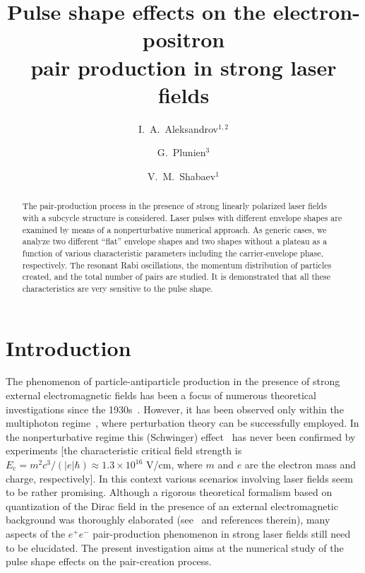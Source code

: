 \documentclass[preprint,aps,prd,showpacs,floatfix]{revtex4-1}
\begin{document}
%
\thispagestyle{empty}

    \title{Pulse shape effects on the electron-positron\\pair production in strong laser fields}

\author{I.~A.~Aleksandrov$^{1, 2}$}\author{G.~Plunien$^{3}$} \author{V.~M.~Shabaev$^{1}$}

\begin{abstract}
The pair-production process in the presence of strong linearly polarized laser fields with a subcycle structure is considered. Laser pulses with different envelope shapes are examined by means of a nonperturbative numerical approach. As generic cases, we analyze two different ``flat'' envelope shapes and two shapes without a plateau as a function of various characteristic parameters including the carrier-envelope phase, respectively. The resonant Rabi oscillations, the momentum distribution of particles created, and the total number of pairs are studied. It is demonstrated that all these characteristics are very sensitive to the pulse shape.
\end{abstract}


\maketitle
%
\section{Introduction}\label{sec:intro}
%
\indent The phenomenon of particle-antiparticle production in the presence of strong external electromagnetic fields has been a focus of numerous theoretical investigations since the 1930s~\cite{sauter_1931, euler_heisenberg}. However, it has been observed only within the multiphoton regime~\cite{burke_prl_1997}, where perturbation theory can be successfully employed. In the nonperturbative regime this (Schwinger) effect~\cite{schwinger_1951} has never been confirmed by experiments [the characteristic critical field strength is $E_\text{c} = m^2 c^3/(|e| \hbar) \approx 1.3 \times 10^{16}$ V/cm, where $m$ and $e$ are the electron mass and charge, respectively]. In this context various scenarios involving laser fields seem to be rather promising. Although a rigorous theoretical formalism based on quantization of the Dirac field in the presence of an external electromagnetic background was thoroughly elaborated (see~\cite{fradkin_gitman_shvartsman} and references therein), many aspects of the $e^+e^-$ pair-production phenomenon in strong laser fields still need to be elucidated. The present investigation aims at the numerical study of the pulse shape effects on the pair-creation process.
\end{document}
